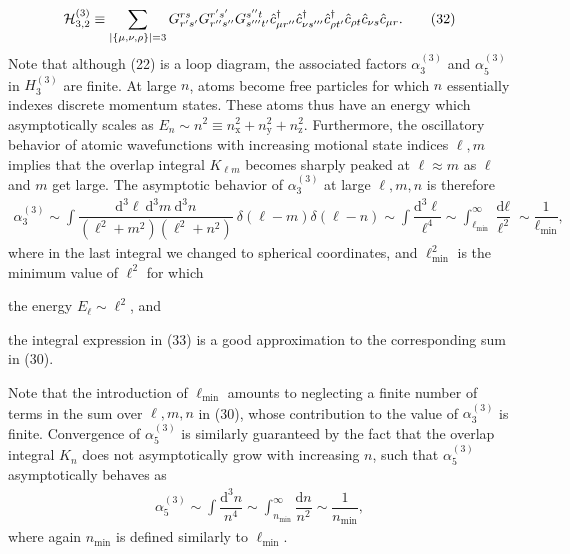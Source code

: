 \documentclass[preprint,showkeys,nofootinbib]{revtex4-1}
\renewcommand{\t}{\text} %
\newcommand{\f}{\dfrac} %
\newcommand{\p}[1]{\left(#1\right)} %
\renewcommand{\set}[1]{\left\{#1\right\}} %
\renewcommand{\d}{\text{d}}
\newcommand{\x}{\text{x}}
\newcommand{\y}{\text{y}}
\newcommand{\z}{\text{z}}
\renewcommand{\c}{\hat{c}}
\renewcommand{\H}{\mathcal{H}}
\newcommand{\1}{\mathds{1}}
\begin{document}
\begin{enumerate}
{    \begin{align}
      \H_{3,2}^{(3)} \equiv \sum_{\abs{\set{\mu,\nu,\rho}}=3}
      G^{rs}_{r's'} G^{r's'}_{r''s''} G^{s''t}_{s'''t'}
      \c_{\mu r''}^\dag \c_{\nu s'''}^\dag \c_{\rho t'}^\dag
      \c_{\rho t} \c_{\nu s} \c_{\mu r}.
      \tag{32}
    \end{align}
    Note that although (22) is a loop diagram, the associated factors
    $\alpha_3^{(3)}$ and $\alpha_5^{(3)}$ in $H_3^{(3)}$ are finite.
    At large $n$, atoms become free particles for which $n$
    essentially indexes discrete momentum states.  These atoms thus
    have an energy which asymptotically scales as
    $E_n\sim n^2\equiv n_\x^2+n_\y^2+n_\z^2$.  Furthermore, the
    oscillatory behavior of atomic wavefunctions with increasing
    motional state indices $\ell,m$ implies that the overlap integral
    $K_{\ell m}$ becomes sharply peaked at $\ell\approx m$ as $\ell$
    and $m$ get large.  The asymptotic behavior of $\alpha_3^{(3)}$ at
    large $\ell,m,n$ is therefore
    \begin{align}
      \alpha_3^{(3)}
      \sim \int \f{\d^3\ell~\d^3m~\d^3n}{\p{\ell^2+m^2}\p{\ell^2+n^2}}
      ~\delta\p{\ell-m}\delta\p{\ell-n}
      \sim \int \f{\d^3\ell}{\ell^4}
      \sim \int_{\ell_{\t{min}}}^\infty \f{\d\ell}{\ell^2}
      \sim \f1{\ell_{\t{min}}},
      \tag{33}
    \end{align}
    where in the last integral we changed to spherical coordinates,
    and $\ell_{\t{min}}^2$ is the minimum value of $\ell^2$ for which
    \begin{enumerate*}
    \item the energy $E_\ell\sim\ell^2$, and
    \item the integral expression in (33) is a good approximation to
      the corresponding sum in (30).
    \end{enumerate*}
    Note that the introduction of $\ell_{\t{min}}$ amounts to
    neglecting a finite number of terms in the sum over $\ell,m,n$ in
    (30), whose contribution to the value of $\alpha_3^{(3)}$ is
    finite.  Convergence of $\alpha_5^{(3)}$ is similarly guaranteed
    by the fact that the overlap integral $K_n$ does not
    asymptotically grow with increasing $n$, such that
    $\alpha_5^{(3)}$ asymptotically behaves as
    \begin{align}
      \alpha_5^{(3)} \sim \int \f{\d^3 n}{n^4}
      \sim \int_{n_{\t{min}}}^\infty \f{\d n}{n^2}
      \sim \f1{n_{\t{min}}},
      \tag{34}
    \end{align}
    where again $n_{\t{min}}$ is defined similarly to
    $\ell_{\t{min}}$.}


\end{enumerate}
\end{document}
